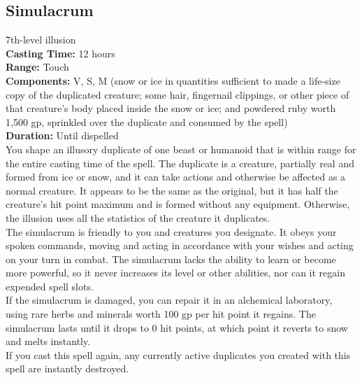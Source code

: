 \documentclass[11pt, A4paper, english]{article}
\begin{document}
		\subsection{Simulacrum}
7th-level illusion \\
\textbf{Casting Time:} 12 hours \\
\textbf{Range:} Touch \\
\textbf{Components:} V, S, M (snow or ice in quantities sufficient to made a life-size copy of the duplicated creature; some hair, fingernail clippings, or other piece of that creature’s body placed inside the snow or ice; and powdered ruby worth 1,500 gp, sprinkled over the duplicate and consumed by the spell) \\
\textbf{Duration:} Until dispelled \\
You shape an illusory duplicate of one beast or humanoid that is within range for the entire casting time of the spell. The duplicate is a creature, partially real and formed from ice or snow, and it can take actions and otherwise be affected as a normal creature. It appears to be the same as the original, but it has half the creature’s hit point maximum and is formed without any equipment. Otherwise, the illusion uses all the statistics of the creature it duplicates. \\
The simulacrum is friendly to you and creatures you designate. It obeys your spoken commands, moving and acting in accordance with your wishes and acting on your turn in combat. The simulacrum lacks the ability to learn or become more powerful, so it never increases its level or other abilities, nor can it regain expended spell slots. \\
If the simulacrum is damaged, you can repair it in an alchemical laboratory, using rare herbs and minerals worth 100 gp per hit point it regains. The simulacrum lasts until it drops to 0 hit points, at which point it reverts to snow and melts instantly. \\
If you cast this spell again, any currently active duplicates you created with this spell are instantly destroyed.
\end{document}
